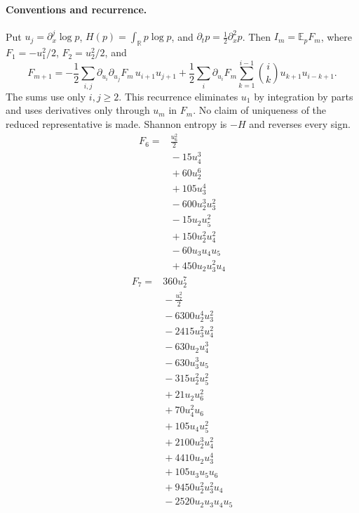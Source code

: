 \paragraph{Conventions and recurrence.}
Put $u_j=\partial_x^j\log p$, $H(p)=\int_{\mathbb R}p\log p$, and $\partial_t p=\tfrac12\partial_x^2p$. Then $I_m=\mathbb E_p F_m$, where $F_1=-u_1^2/2$, $F_2=u_2^2/2$, and
\[F_{m+1}=-\frac12\sum_{i,j}\partial_{u_i}\partial_{u_j}F_m\,u_{i+1}u_{j+1}+\frac12\sum_i\partial_{u_i}F_m\sum_{k=1}^{i-1}\binom{i}{k}u_{k+1}u_{i-k+1}.\]
The sums use only $i,j\ge2$. This recurrence eliminates $u_1$ by integration by parts and uses derivatives only through $u_m$ in $F_m$. No claim of uniqueness of the reduced representative is made. Shannon entropy is $-H$ and reverses every sign.
\begin{align*}
F_{6}={}& \frac{u_{6}^{2}}{2}
\\ &{}-15 u_{4}^{3}
\\ &{}+60 u_{2}^{6}
\\ &{}+105 u_{3}^{4}
\\ &{}-600 u_{2}^{3} u_{3}^{2}
\\ &{}-15 u_{2} u_{5}^{2}
\\ &{}+150 u_{2}^{2} u_{4}^{2}
\\ &{}-60 u_{3} u_{4} u_{5}
\\ &{}+450 u_{2} u_{3}^{2} u_{4}
\end{align*}
\begin{align*}
F_{7}={}& 360 u_{2}^{7}
\\ &{}-\frac{u_{7}^{2}}{2}
\\ &{}-6300 u_{2}^{4} u_{3}^{2}
\\ &{}-2415 u_{3}^{2} u_{4}^{2}
\\ &{}-630 u_{2} u_{4}^{3}
\\ &{}-630 u_{3}^{3} u_{5}
\\ &{}-315 u_{2}^{2} u_{5}^{2}
\\ &{}+21 u_{2} u_{6}^{2}
\\ &{}+70 u_{4}^{2} u_{6}
\\ &{}+105 u_{4} u_{5}^{2}
\\ &{}+2100 u_{2}^{3} u_{4}^{2}
\\ &{}+4410 u_{2} u_{3}^{4}
\\ &{}+105 u_{3} u_{5} u_{6}
\\ &{}+9450 u_{2}^{2} u_{3}^{2} u_{4}
\\ &{}-2520 u_{2} u_{3} u_{4} u_{5}
\end{align*}
